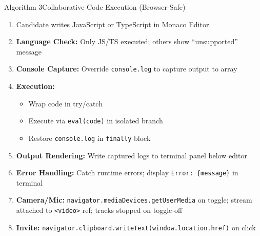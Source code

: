 \documentclass{beamer}
\begin{document}
\begin{frame}{Algorithm 3}{Collaborative Code Execution (Browser-Safe)}
\begin{enumerate}
    \item Candidate writes JavaScript or TypeScript in Monaco Editor

    \item \textbf{Language Check:} Only JS/TS executed; others show ``unsupported'' message

    \item \textbf{Console Capture:} Override \texttt{console.log} to capture output to array

    \item \textbf{Execution:}
    \begin{itemize}
        \item Wrap code in try/catch
        \item Execute via \texttt{eval(code)} in isolated branch
        \item Restore \texttt{console.log} in \texttt{finally} block
    \end{itemize}

    \item \textbf{Output Rendering:} Write captured logs to terminal panel below editor

    \item \textbf{Error Handling:} Catch runtime errors; display \texttt{Error: \{message\}} in terminal

    \item \textbf{Camera/Mic:} \texttt{navigator.mediaDevices.getUserMedia} on toggle; stream attached to \texttt{<video>} ref; tracks stopped on toggle-off

    \item \textbf{Invite:} \texttt{navigator.clipboard.writeText(window.location.href)} on click
\end{enumerate}
\end{frame}
\end{document}
